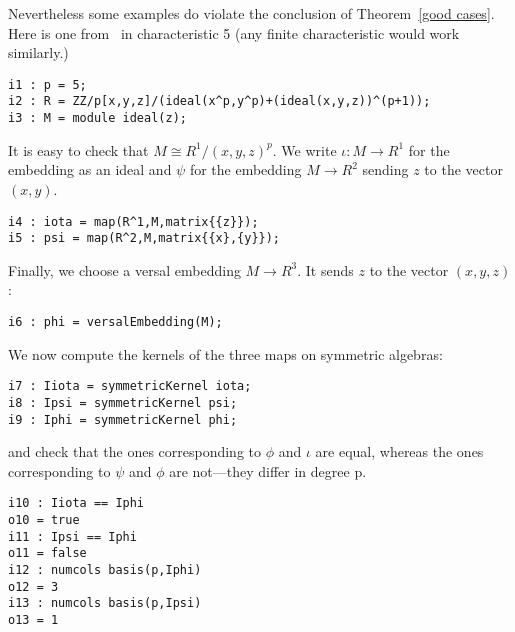 \documentclass[twoside,12pt, leqno]{amsart}
\begin{document}
Nevertheless some examples do violate the conclusion of Theorem~\ref{good cases}. Here is one from~\cite{EHU}
in characteristic 5 (any finite characteristic would work similarly.)
 \begin{footnotesize}
  \begin{verbatim}
i1 : p = 5;
i2 : R = ZZ/p[x,y,z]/(ideal(x^p,y^p)+(ideal(x,y,z))^(p+1));
i3 : M = module ideal(z);
 \end{verbatim}
\end{footnotesize}
    It is easy to check that $M \cong R^1/(x,y,z)^p$.
     We write $\iota: M\to R^1$ for the embedding as an ideal
     and $\psi$ for the embedding $M \to R^2$ sending $z$ to the vector $(x,y)$.
\begin{footnotesize} \begin{verbatim}
i4 : iota = map(R^1,M,matrix{{z}});
i5 : psi = map(R^2,M,matrix{{x},{y}});
\end{verbatim}\end{footnotesize}
      Finally, we choose a versal embedding $M \to R^3$.
     It sends $z$ to the vector $(x,y,z)$:
\begin{footnotesize}\begin{verbatim}
i6 : phi = versalEmbedding(M);
\end{verbatim}\end{footnotesize}
\begin{normalsize}
     We now compute the kernels of the three maps
     on symmetric algebras:
\begin{footnotesize}
 \begin{verbatim}
i7 : Iiota = symmetricKernel iota;
i8 : Ipsi = symmetricKernel psi;
i9 : Iphi = symmetricKernel phi;
\end{verbatim}
\end{footnotesize}
      and check that the ones corresponding to $\phi$ and $\iota$
     are equal, whereas the ones corresponding to $\psi$ and $\phi$
     are not---they differ in degree p.
\begin{footnotesize} \begin{verbatim}
i10 : Iiota == Iphi    
o10 = true
i11 : Ipsi == Iphi
o11 = false
i12 : numcols basis(p,Iphi) 
o12 = 3
i13 : numcols basis(p,Ipsi)
o13 = 1
\end{verbatim}
\end{footnotesize}
\end{normalsize}
\end{document}
